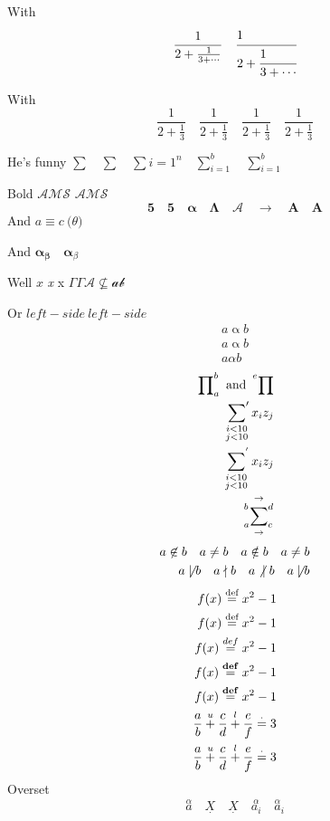 \documentclass{amsart}
\DeclareMathOperator\bsum{\pmb\sum}
\DeclareMathOperator*\bsm{\pmb\sum}
\begin{document}
With
\[
    \frac1{2+\frac1{3+\cdots}} \quad \cfrac[l]1{2 + \cfrac[l]1{3+\cdots}}
\]

With
\[
    \frac1{\displaystyle 2 + \frac13} \quad \frac1{2 + \frac13} \quad
    \frac1{\scriptstyle 2 + \frac13} \quad \frac1{\scriptscriptstyle 2 + \frac13}
\]

He's funny $\sum \quad \boldsymbol\sum \quad \pmb\sum{i=1}^n \quad \bsum\limits_{i=1}^b \quad \bsm\limits_{i=1}^b$

Bold $\boldsymbol{\mathcal{AMS}}$ {$\mathcal{AMS}$}
\[
    \boldsymbol 5 \quad \mathbf 5 \quad \boldsymbol\alpha \quad
    \boldsymbol\Lambda \quad \boldsymbol{\mathcal A} \quad
    \boldsymbol\to \quad \boldsymbol A \quad
    \mathbf A
\]
And { $a \equiv c \pod\theta$}

And $\boldsymbol\alpha_{\boldsymbol\beta} \quad \boldsymbol\alpha_\beta$

Well $x$ \textit x x $\mathit\Gamma \varGamma \mathcal A \nsubseteq \mathcal a \mathcal b$
 
Or $\mathit{left-side}\ left-side$
\begin{align*}
    a \mathbin\alpha b\\
    a \mathrel\alpha b\\
    a \alpha b
\end{align*}
\begin{align*}
    \sideset{}{_a^b}\prod \text{ and } \sideset{^e}{}\prod\\
    \sideset{}{'}\sum_{\substack{i<10\\j<10}} x_iz_j\\
    \sideset{}{^{'}}\sum_{\substack{i<10\\j<10}} x_iz_j\\
    \sideset{_a^b}{_c^d}{\sum}_{\to}^{\to}
\end{align*}
\begin{align*}
    a \not\in b \quad a \not= b \quad a \notin b \quad a \ne b\\
    a \not\mid b \quad a \nmid b \quad a \mathrel{\not|} b \quad a \mathrel{\not\mid} b
\end{align*}
\begin{align*}
    f(x) \overset{\text{def}}= x^2 - 1\\
    f(x) \overset{\normalfont\text{def}}= x^2 - 1\\
    f(x) \overset{def}= x^2 - 1\\
    f(x) \overset{\mathbf{def}}= x^2 - 1\\
    f(x) \overset{\text{\textbf{def}}}= x^2 - 1\\
    \frac ab \overset u+ \frac cd \overset l+ \frac ef \overset\cdot= 3\\
    \frac ab \overset{\normalfont u}+ \frac cd \overset{\normalfont l}+ \frac ef \overset\cdot= 3
\end{align*}
Overset
\[
    \overset\alpha a \quad
    \underset{\boldsymbol\cdot}X \quad
    \underset\cdot X \quad
    \overset\alpha{a_i} \quad
    {\overset\alpha a}_i
\]
\end{document}
